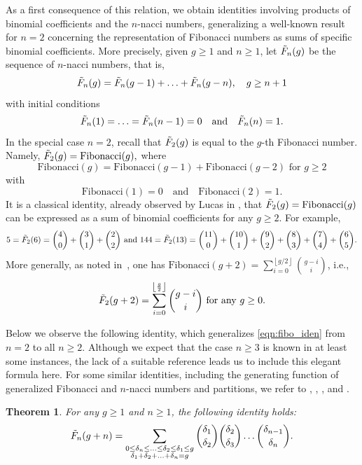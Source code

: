 \documentclass[11pt]{amsart}
\numberwithin{equation}{section}
\theoremstyle{plain}
\newcommand{\<}{\left \langle}
\renewcommand{\>}{\right \rangle}
\newtheorem*{thm*}{Theorem}
\theoremstyle{definition}
\theoremstyle{remark}
\begin{document}
As a first consequence of this relation, we obtain identities involving products of binomial coefficients and the $n$-nacci numbers, generalizing a well-known result for $n = 2$ concerning the representation of Fibonacci numbers as sums of specific binomial coefficients. 
More precisely, given $g \geq 1$ and $n \geq 1$, let $\Tilde{F}_n(g)$ be  the sequence of $n$-nacci numbers, that is, $$\Tilde{F}_n(g) = \Tilde{F}_n(g - 1) + \ldots + \Tilde{F}_n(g - n),\quad  g \geq n + 1$$  with initial conditions $$\Tilde{F}_n(1) = \ldots = \Tilde{F}_n(n - 1) = 0\quad \text{and}\quad \Tilde{F}_n(n) = 1.$$
In the special case $n = 2$, recall that $\Tilde{F}_2(g)$ is equal to the $g$-th Fibonacci number. Namely, $\Tilde{F}_2(g) = \mathrm{Fibonacci}(g),$ where $$\mathrm{Fibonacci}(g) = \mathrm{Fibonacci}(g - 1) + \mathrm{Fibonacci}(g-2) \text{ for }g \geq 2$$ with 
$$\mathrm{Fibonacci}(1) = 0\quad \text{and}\quad \mathrm{Fibonacci}(2) = 1.$$
It is a classical identity, already observed by Lucas in \cite{luc}, that $\Tilde{F}_2(g) = \mathrm{Fibonacci}(g)$ can be expressed as a sum of binomial coefficients for any $g\geq 2$. For example,
$$5 = \Tilde{F}_2(6) = {4 \choose 0} + {3 \choose 1} + {2 \choose 2} \text{ and } 144 = \Tilde{F}_2(13) = {11 \choose 0} + {10 \choose 1} + {9 \choose 2} + {8 \choose 3} + {7 \choose 4} + {6 \choose 5}.$$
More generally, as noted in~\cite[p.~7]{luc}, one has $\mathrm{Fibonacci}(g+2) = \sum_{i = 0}^{\left \lfloor {g}/{2} \right \rfloor} {g - i \choose i}$, i.e.,
\begin{equation}
\Tilde{F}_2(g + 2) = \sum_{i = 0}^{\left \lfloor \frac{g}{2}\right \rfloor} {g - i \choose i} \text{ for any } g\geq 0.
\label{eqn:fibo_iden}
\end{equation}


Below we observe the following identity, which generalizes \eqref{eqn:fibo_iden} from $n = 2$ to all $n \geq 2$. Although we expect that the case $n \geq 3$ is known in at least some instances, the lack of a suitable reference leads us to include this elegant formula here. For some similar identities, including the generating function of generalized Fibonacci and $n$-nacci numbers and partitions, we refer to \cite{yang}, \cite{huangliu}, \cite{sills}, and \cite{komatsu}.
 

\begin{thm*} For any $g \geq 1$ and $n \geq 1$, the following identity holds: 
$$\Tilde{F}_n(g + n) = \sum_{\substack{0 \leq \delta_n \leq \ldots \leq \delta_2 \leq \delta_1 \leq g \\ \delta_1 + \delta_2 + \ldots + \delta_n = g}} {\delta_1 \choose \delta_2}{\delta_2 \choose \delta_3}\ldots {\delta_{n -1} \choose \delta_{n}}.$$
\end{thm*}
\end{document}
